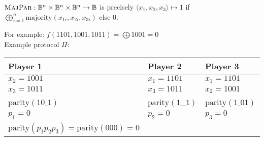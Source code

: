 \begin{example}
\(\textsc{MajPar} : \mathbb{B}^n \times \mathbb{B}^n \times \mathbb{B}^n \to \mathbb{B}\)
is precisely
\(\langle x_{1}, x_{2}, x_{3} \rangle \mapsto 1\)
if $\bigoplus_{i = 1}^{n} \text{majority}(x_{1i}, x_{2i}, x_{3i})$ else 0.
\end{example}
\pause
For example: $f(1101, 1001, 1011) = \bigoplus 1001 = 0$\\
\pause
Example protocol $\Pi$:\\

\begin{tabular}{|lll|}
  \hline
  Player 1 & Player 2 & Player 3 \\ [0.5ex] 
  \hline
  $x_{2}=1001$                                    & $x_{1}=1101$          & $x_{1}=1101$         \\
  $x_{3}=1011$                                    & $x_{3}=1011$          & $x_{2}=1001$         \\
                                                  &                       &                      \\
  $\text{parity}(1 0 \_ 1)$                       & $\text{parity}(1 \_ \_ 1)$   
                                                  & $\text{parity}(1 \_ 0 1)$ \\
  $p_{1} = 0$                                     & $p_{2} = 0$          
                                                  & $p_{3} = 0$          \\\hline
  $\text{parity}(p_{1}p_{2}p_{3}) = \text{parity}(000) = 0$  &  & \\\hline
\end{tabular}

